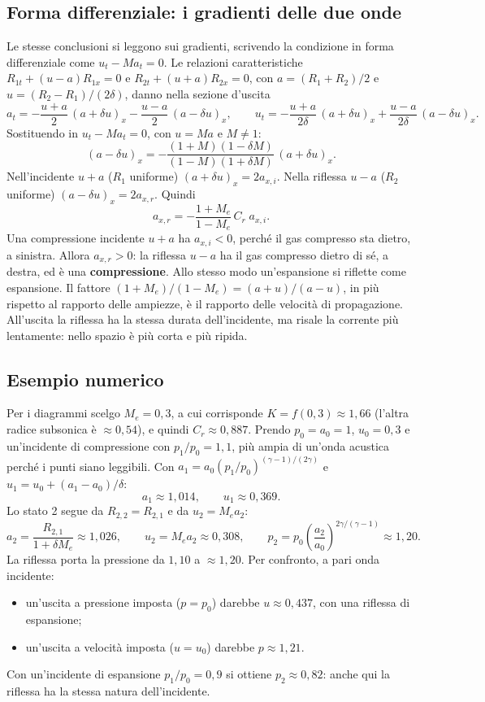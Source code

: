 \documentclass[11pt,a4paper]{article}
\newcommand{\Ru}{R_1}
\newcommand{\Rd}{R_2}
\newcommand{\uma}{u-a}
\newcommand{\upa}{u+a}
\newcommand{\Me}{M_e}
\newcommand{\Cr}{C_r}
\begin{document}
\subsection{Forma differenziale: i gradienti delle due onde}
Le stesse conclusioni si leggono sui gradienti, scrivendo la condizione in forma differenziale come
$u_t-M a_t=0$. Le relazioni caratteristiche $R_{1t}+(u-a)R_{1x}=0$ e $R_{2t}+(u+a)R_{2x}=0$, con $a=(\Ru+\Rd)/2$ e
$u=(\Rd-\Ru)/(2\delta)$, danno nella sezione d'uscita
\[
  a_t=-\frac{u+a}{2}\,(a+\delta u)_x-\frac{u-a}{2}\,(a-\delta u)_x,\qquad
  u_t=-\frac{u+a}{2\delta}\,(a+\delta u)_x+\frac{u-a}{2\delta}\,(a-\delta u)_x .
\]
Sostituendo in $u_t-Ma_t=0$, con $u=Ma$ e $M\neq1$:
\[
  (a-\delta u)_x=-\frac{(1+M)(1-\delta M)}{(1-M)(1+\delta M)}\,(a+\delta u)_x .
\]
Nell'incidente $\upa$ ($\Ru$ uniforme) $(a+\delta u)_x=2a_{x,i}$. Nella riflessa $\uma$ ($\Rd$ uniforme)
$(a-\delta u)_x=2a_{x,r}$. Quindi
\[
  a_{x,r}=-\frac{1+\Me}{1-\Me}\,\Cr\;a_{x,i}.
\]
Una compressione incidente $\upa$ ha $a_{x,i}<0$, perché il gas compresso sta dietro, a sinistra. Allora
$a_{x,r}>0$: la riflessa $\uma$ ha il gas compresso dietro di sé, a destra, ed è una \textbf{compressione}.
Allo stesso modo un'espansione si riflette come espansione. Il fattore $(1+\Me)/(1-\Me)=(a+u)/(a-u)$, in più
rispetto al rapporto delle ampiezze, è il rapporto delle velocità di propagazione. All'uscita la riflessa ha la
stessa durata dell'incidente, ma risale la corrente più lentamente: nello spazio è più corta e più ripida.

\subsection{Esempio numerico}
Per i diagrammi scelgo $\Me=0{,}3$, a cui corrisponde $K=f(0{,}3)\approx1{,}66$ (l'altra radice subsonica è
$\approx0{,}54$), e quindi $\Cr\approx0{,}887$. Prendo $p_0=a_0=1$, $u_0=0{,}3$ e un'incidente di compressione con
$p_1/p_0=1{,}1$, più ampia di un'onda acustica perché i punti siano leggibili. Con $a_1=a_0(p_1/p_0)^{(\gamma-1)/(2\gamma)}$
e $u_1=u_0+(a_1-a_0)/\delta$:
\[
  a_1\approx1{,}014,\qquad u_1\approx0{,}369 .
\]
Lo stato 2 segue da $R_{2,2}=R_{2,1}$ e da $u_2=\Me a_2$:
\[
  a_2=\frac{R_{2,1}}{1+\delta\Me}\approx1{,}026,\qquad u_2=\Me a_2\approx0{,}308,\qquad
  p_2=p_0\left(\frac{a_2}{a_0}\right)^{2\gamma/(\gamma-1)}\approx1{,}20 .
\]
La riflessa porta la pressione da $1{,}10$ a $\approx1{,}20$. Per confronto, a pari onda incidente:
\begin{itemize}
  \item un'uscita a pressione imposta ($p=p_0$) darebbe $u\approx0{,}437$, con una riflessa di espansione;
  \item un'uscita a velocità imposta ($u=u_0$) darebbe $p\approx1{,}21$.
\end{itemize}
Con un'incidente di espansione $p_1/p_0=0{,}9$ si ottiene $p_2\approx0{,}82$: anche qui la riflessa ha la stessa
natura dell'incidente.
\end{document}
